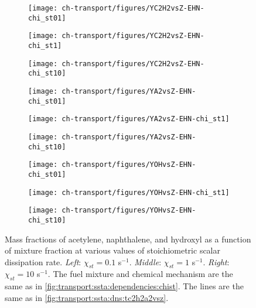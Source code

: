 \begin{figure}[ht]
  \centering
  \begin{subfigure}[b]{0.33\linewidth}
    \centering
    \texttt{[image: ch-transport/figures/YC2H2vsZ-EHN-chi\_st01]}
  \end{subfigure}%
  \begin{subfigure}[b]{0.33\linewidth}
    \centering
    \texttt{[image: ch-transport/figures/YC2H2vsZ-EHN-chi\_st1]}
  \end{subfigure}%
  \begin{subfigure}[b]{0.33\linewidth}
    \centering
    \texttt{[image: ch-transport/figures/YC2H2vsZ-EHN-chi\_st10]}
  \end{subfigure}
  \begin{subfigure}[b]{0.33\linewidth}
    \centering
    \texttt{[image: ch-transport/figures/YA2vsZ-EHN-chi\_st01]}
  \end{subfigure}%
  \begin{subfigure}[b]{0.33\linewidth}
    \centering
    \texttt{[image: ch-transport/figures/YA2vsZ-EHN-chi\_st1]}
  \end{subfigure}%
  \begin{subfigure}[b]{0.33\linewidth}
    \centering
    \texttt{[image: ch-transport/figures/YA2vsZ-EHN-chi\_st10]}
  \end{subfigure}
  \begin{subfigure}[b]{0.33\linewidth}
    \centering
    \texttt{[image: ch-transport/figures/YOHvsZ-EHN-chi\_st01]}
  \end{subfigure}%
  \begin{subfigure}[b]{0.33\linewidth}
    \centering
    \texttt{[image: ch-transport/figures/YOHvsZ-EHN-chi\_st1]}
  \end{subfigure}%
  \begin{subfigure}[b]{0.33\linewidth}
    \centering
    \texttt{[image: ch-transport/figures/YOHvsZ-EHN-chi\_st10]}
  \end{subfigure}
  \caption[Trends of \texorpdfstring{$Y_{\ce{C2H2}}$}{YC2H2}, \texorpdfstring{$Y_{\text{A2}}$}{YA2}, and \texorpdfstring{$Y_{\ce{OH}}$}{YOH} with \texorpdfstring{$\chi_{st}$}{Xst}]{Mass fractions of acetylene, naphthalene, and hydroxyl as a function of mixture fraction at various values of stoichiometric scalar dissipation rate. \textit{Left}: $\chi_{st} = 0.1$ s$^{-1}$. \textit{Middle}: $\chi_{st} = 1$ s$^{-1}$. \textit{Right}: $\chi_{st} = 10$ s$^{-1}$. The fuel mixture and chemical mechanism are the same as in \cref{fig:transport:ssta:dependencies:chist}. The lines are the same as in \cref{fig:transport:ssta:dns:tc2h2a2vsz}.}
  \label{fig:transport:ssta:dependencies:c2h2a2vschist}
\end{figure}

